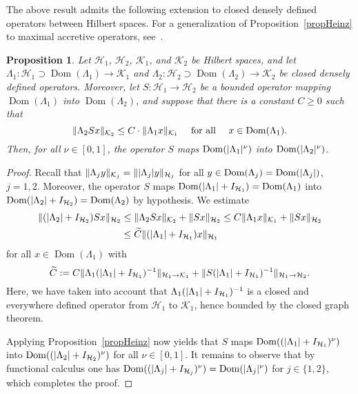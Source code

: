 \documentclass[11pt,a4paper]{amsart}
\numberwithin{equation}{section}
\DeclareMathOperator{\Dom}{Dom}
\DeclarePairedDelimiter{\abs}{|}{|}
\DeclarePairedDelimiter{\norm}{\lVert}{\rVert}
\newcommand{\cH}{{\mathcal H}}
\newcommand{\cK}{{\mathcal K}}
\theoremstyle{plain}
\newtheorem{proposition}[theorem]{Proposition}
\theoremstyle{definition}
\theoremstyle{remark}
\begin{document}
The above result admits the following extension to closed densely defined operators between Hilbert spaces. For a generalization
of Proposition~\ref{propHeinz} to maximal accretive operators, see~\cite{Kato61}.

\begin{proposition}\label{prop:heinz}
  Let $\cH_1$, $\cH_2$, $\cK_1$, and $\cK_2$ be Hilbert spaces, and let $\Lambda_1\colon\cH_1\supset\Dom(\Lambda_1)\to\cK_1$ and
  $\Lambda_2\colon\cH_2\supset\Dom(\Lambda_2)\to\cK_2$ be closed densely defined operators. Moreover, let $S\colon\cH_1\to\cH_2$
  be a bounded operator mapping $\Dom(\Lambda_1)$ into $\Dom(\Lambda_2)$, and suppose that there is a constant $C\ge0$ such that
  \begin{equation*}
    \norm{\Lambda_2Sx}_{\cK_2}
    \le
    C\cdot\norm{\Lambda_1x}_{\cK_1}
    \quad\text{ for all }\quad
    x\in\Dom(\Lambda_1)
    .
  \end{equation*}
  Then, for all $\nu\in[0,1]$, the operator $S$ maps $\Dom(\abs{\Lambda_1}^\nu)$ into $\Dom(\abs{\Lambda_2}^\nu)$.
\end{proposition}

\begin{proof}
  Recall that $\norm{\Lambda_jy}_{\cK_j}=\norm{\abs{\Lambda_j}y}_{\cH_j}$ for all $y\in\Dom(\Lambda_j)=\Dom(\abs{\Lambda_j})$,
  $j=1,2$. Moreover, the operator $S$ maps $\Dom(\abs{\Lambda_1}+I_{\cH_1})=\Dom(\Lambda_1)$ into
  $\Dom(\abs{\Lambda_2}+I_{\cH_2})=\Dom(\Lambda_2)$ by hypothesis. We estimate
  \begin{align*}
    \norm{(\abs{\Lambda_2}+I_{\cH_2})Sx}_{\cH_2}
    &\le
    \norm{\Lambda_2Sx}_{\cK_2} + \norm{Sx}_{\cH_2} \le C \norm{\Lambda_1x}_{\cK_1} + \norm{Sx}_{\cH_2}\\
    &\le
    \widetilde{C} \norm{(\abs{\Lambda_1}+I_{\cH_1})x}_{\cH_1}
  \end{align*}
  for all $x\in\Dom(\Lambda_1)$ with
  \begin{equation*}
    \widetilde{C}
    :=
    C\norm{\Lambda_1(\abs{\Lambda_1}+I_{\cH_1})^{-1}}_{\cH_1\to\cK_1} + \norm{S(\abs{\Lambda_1}+I_{\cH_1})^{-1}}_{\cH_1\to\cH_2}
    .
  \end{equation*}
  Here, we have taken into account that $\Lambda_1(\abs{\Lambda_1}+I_{\cH_1})^{-1}$ is a closed and everywhere defined operator
  from $\cH_1$ to $\cK_1$, hence bounded by the closed graph theorem.

  Applying Proposition~\ref{propHeinz} now yields that $S$ maps $\Dom((\abs{\Lambda_1}+I_{\cH_1})^\nu)$ into
  $\Dom((\abs{\Lambda_2}+I_{\cH_2})^\nu)$ for all $\nu\in[0,1]$. It remains to observe that by functional calculus one has
  $\Dom((\abs{\Lambda_j}+I_{\cH_j})^\nu)=\Dom(\abs{\Lambda_j}^\nu)$ for $j\in\{1,2\}$, which completes the proof.
\end{proof}%
\end{document}
